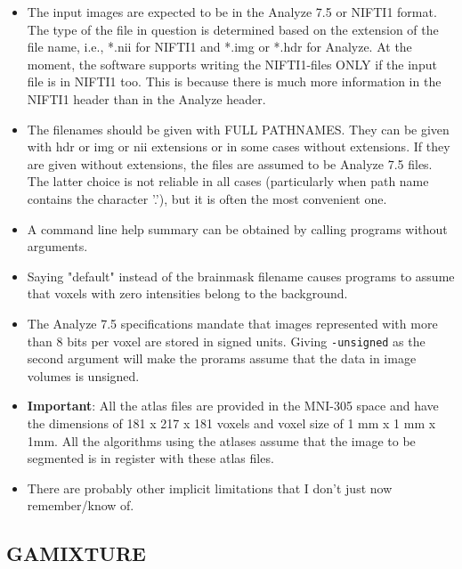 \documentclass[12pt]{article}
\begin{document}
\begin{itemize}

\item The input images are expected to be in the Analyze 7.5 or NIFTI1 format. The type of the file  in question is determined based on the extension of the file name, i.e., *.nii for NIFTI1 and *.img or *.hdr for Analyze. At the moment, the software supports writing the NIFTI1-files ONLY if the input file is in NIFTI1 too. This is because there is much more information in the NIFTI1 header than in the Analyze header.   

\item The filenames should be given with FULL PATHNAMES. They can be given
with hdr or img or nii extensions or in some cases without extensions. If they are given without extensions, the files are assumed to be Analyze 7.5 files. 
The latter choice is not reliable in all cases (particularly when path
name contains the character '.'), but it is often the most convenient one.

\item A command line help summary
can be obtained by calling programs without arguments.

\item  Saying "default" instead of the brainmask filename causes programs
to assume that voxels with zero intensities belong to the background.

\item The Analyze 7.5 specifications mandate that images represented
with more than 8 bits per voxel are stored in signed units. 
Giving {\tt -unsigned} as the second argument will make the
prorams assume that the data in image volumes is unsigned.  

\item {\bf Important}: All the atlas files are provided in the MNI-305 space and have the dimensions of 181 x 217 x 181 voxels and voxel size of 1 mm x 1 mm x 1mm. All the algorithms using the atlases assume that the image to be segmented is in register with these atlas files.

\item There are probably other implicit limitations that I don't just now
remember/know of.

\end{itemize}

\subsection{GAMIXTURE}
\end{document}
